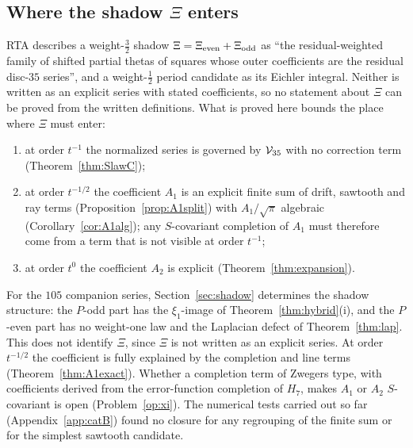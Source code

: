 \subsection{Where the shadow $\Xi$ enters}
RTA describes a weight-$\frac32$ shadow $\Xi=\Xi_{\rm even}+\Xi_{\rm odd}$ as ``the residual-weighted family of shifted partial thetas of squares whose outer coefficients are the
residual disc-$35$ series'', and a weight-$\frac12$ period candidate as its Eichler integral. Neither is written as an explicit series with stated coefficients, so no
statement about $\Xi$ can be proved from the written definitions. What is proved here bounds the place where $\Xi$ must enter:
\begin{enumerate}[label=(\roman*),leftmargin=2em]
\item at order $t^{-1}$ the normalized series is governed by $\mathcal V_{35}$ with no correction term (Theorem~\ref{thm:SlawC});
\item at order $t^{-1/2}$ the coefficient $A_1$ is an explicit finite sum of drift, sawtooth and ray terms (Proposition~\ref{prop:A1split}) with $A_1/\sqrt\pi$ algebraic
(Corollary~\ref{cor:A1alg}); any $S$-covariant completion of $A_1$ must therefore come from a term that is not visible at order $t^{-1}$;
\item at order $t^0$ the coefficient $A_2$ is explicit (Theorem~\ref{thm:expansion}).
\end{enumerate}
For the $105$ companion series, Section~\ref{sec:shadow} determines the shadow structure: the $P$-odd part has the $\xi_1$-image of
Theorem~\ref{thm:hybrid}(i), and the $P$-even part has no weight-one law and the Laplacian defect of Theorem~\ref{thm:lap}. This does not identify $\Xi$, since $\Xi$ is
not written as an explicit series. At order $t^{-1/2}$ the coefficient is fully explained by the completion and line terms (Theorem~\ref{thm:A1exact}). Whether a completion term of Zwegers type, with coefficients derived from the error-function completion of $H_7$, makes $A_1$ or $A_2$ $S$-covariant is open
(Problem~\ref{op:xi}). The numerical tests carried out so far (Appendix~\ref{app:catB}) found no closure for any regrouping of the finite sum or for the simplest sawtooth
candidate.

